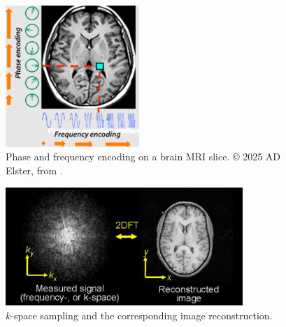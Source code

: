\begin{figure}[htbp]
    \centering
    \includegraphics[width=0.45\textwidth]{figures/encoding.png}
    \caption{Phase and frequency encoding on a brain MRI slice. © 2025 AD Elster, from \cite{mri_questions}.}
    \label{fig:encoding}
\end{figure}

\begin{figure}[htbp]
    \centering
    \includegraphics[width=0.8\textwidth]{figures/kspace.png}
    \caption{$k$-space sampling and the corresponding image reconstruction.}
    \label{fig:kspace}
\end{figure}
